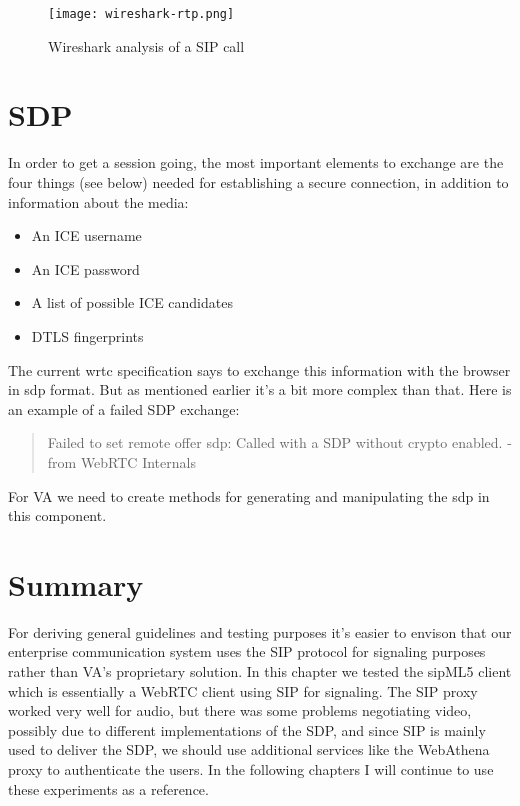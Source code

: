 \begin{figure}[here]
\centerline{\texttt{[image: wireshark-rtp.png]}}
\caption{Wireshark analysis of a SIP call}
\label{fig:wireshark-sip-call}
\end{figure}

\section{SDP}
In order to get a session going, the most important elements to exchange are the four things (see below) needed for establishing a secure connection, in addition to information about the media:

\begin{itemize}
\item{An ICE username}
\item{An ICE password}
\item{A list of possible ICE candidates}
\item{DTLS fingerprint}s
\end{itemize}

The current \gls{wrtc} specification says to exchange this information with the browser in \gls{sdp} format. But as mentioned earlier it's a bit more complex than that. Here is an example of a failed SDP exchange:

\begin{quote}
Failed to set remote offer sdp: Called with a SDP without crypto enabled. -from WebRTC Internals
\end{quote}

For VA we need to create methods for generating and manipulating the \gls{sdp} in this component.

\section{Summary}
For deriving general guidelines and testing purposes it's easier to envison that our enterprise communication system uses the SIP protocol for signaling purposes rather than VA's proprietary solution. In this chapter we tested the sipML5 client which is essentially a WebRTC client using SIP for signaling. The SIP proxy worked very well for audio, but there was some problems negotiating video, possibly due to different implementations of the SDP, and since SIP is mainly used to deliver the SDP, we should use additional services like the WebAthena proxy to authenticate the users. In the following chapters I will continue to use these experiments as a reference.
